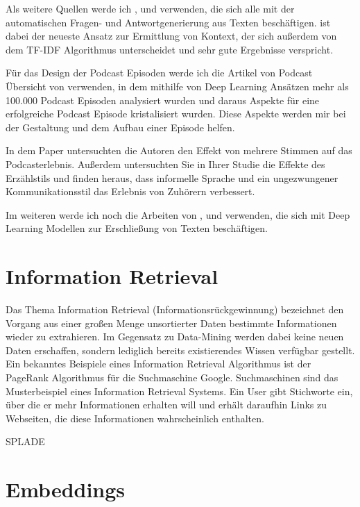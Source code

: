 Als weitere Quellen werde ich \cite{karpukhin2020}, \cite{reddy2019} und \cite{choi2018} verwenden, die sich alle mit der automatischen Fragen- und Antwortgenerierung aus Texten beschäftigen.
\cite{karpukhin2020} ist dabei der neueste Ansatz zur Ermittlung von Kontext, der sich außerdem von dem TF-IDF Algorithmus unterscheidet und sehr gute Ergebnisse verspricht.

Für das Design der Podcast Episoden werde ich die Artikel von Podcast Übersicht von \cite{jones2021} verwenden, in dem mithilfe von Deep Learning Ansätzen mehr als 100.000 Podcast Episoden analysiert wurden und daraus Aspekte für eine erfolgreiche Podcast Episode kristalisiert wurden. Diese Aspekte werden mir bei der Gestaltung und dem Aufbau einer Episode helfen. 

In dem Paper \cite{kang2012} untersuchten die Autoren den Effekt von mehrere Stimmen auf das Podcasterlebnis. Außerdem untersuchten Sie in Ihrer Studie die Effekte des Erzählstils und finden heraus, dass informelle Sprache und ein ungezwungener Kommunikationsstil das Erlebnis von Zuhörern verbessert. 



Im weiteren werde ich noch die Arbeiten von \cite{maroni2020}, \cite{clark2020} und \cite{du2017} verwenden, die sich mit Deep Learning Modellen zur Erschließung von Texten beschäftigen.

\section{Information Retrieval}

Das Thema Information Retrieval (Informationsrückgewinnung) bezeichnet den Vorgang aus einer großen Menge unsortierter Daten bestimmte Informationen wieder zu extrahieren.
Im Gegensatz zu Data-Mining werden dabei keine neuen Daten erschaffen, sondern lediglich bereits existierendes Wissen verfügbar gestellt.
Ein bekanntes Beispiele eines Information Retrieval Algorithmus ist der PageRank Algorithmus für die Suchmaschine Google.
Suchmaschinen sind das Musterbeispiel eines Information Retrieval Systems.
Ein User gibt Stichworte ein, über die er mehr Informationen erhalten will und erhält daraufhin Links zu Webseiten, die diese Informationen wahrscheinlich enthalten.

SPLADE

\section{Embeddings}

